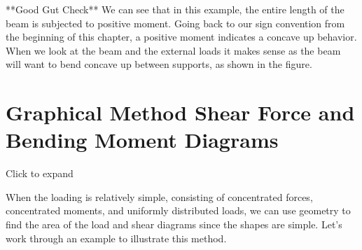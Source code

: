 \documentclass[
  letterpaper,
  DIV=11,
  numbers=noendperiod]{scrreprt}
\begin{document}
\begin{tcolorbox}
**Good Gut Check** We can see that in this example, the entire length of
the beam is subjected to positive moment. Going back to our sign
convention from the beginning of this chapter, a positive moment
indicates a concave up behavior. When we look at the beam and the
external loads it makes sense as the beam will want to bend concave up
between supports, as shown in the figure.

\end{tcolorbox}

\section{Graphical Method Shear Force and Bending Moment
Diagrams}\label{graphical-method-shear-force-and-bending-moment-diagrams}

Click to expand

When the loading is relatively simple, consisting of concentrated
forces, concentrated moments, and uniformly distributed loads, we can
use geometry to find the area of the load and shear diagrams since the
shapes are simple. Let's work through an example to illustrate this
method.
\end{document}
